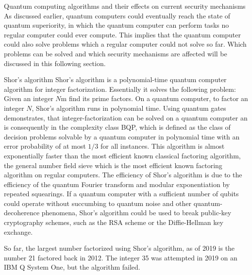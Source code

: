 \documentclass[aps,twocolumn,preprintnumbers]{revtex4}
\begin{document}
\begin{section}{Quantum computing algorithms and their effects on current security mechanisms}
As discussed earlier, quantum computers could eventually reach the state of quantum superiority, 
in which the quantum computer can perform tasks no regular computer could ever compute.
This implies that the quantum computer could also solve problems which a regular computer could not solve so far.
Which problems can be solved and which security mechanisms are affected will be discussed in this following section. 

\begin{subsection}{Shor's algorithm}
Shor's algorithm is a polynomial-time quantum computer algorithm for integer factorization.
Essentially it solves the following problem: 
Given an integer $N$m find its prime factors. 
On a quantum computer, to factor an integer $N$, 
Shor's algorithm runs in polynomial time. 
Using quantum gates demonstrates, 
that integer-factorization can be solved on a quantum computer an is consequently in the complexity class BQP, 
which is defined as the class of decision problems solvable by a quantum computer in polynomial time with an error probability of at most $1/3$ for all instances. 
This algorithm is almost exponentially faster than the most efficient known classical factoring algorithm, the general number field sieve which is the most efficient known factoring algorithm on regular computers. 
The efficiency of Shor's algorithm is due to the efficiency of the quantum Fourier transform and modular exponentiation by repeated squearings. 
If a quantum computer with a sufficient number of qubits could operate without succumbing to quantum noise and other quantum-decoherence phenomena, 
Shor's algorithm could be used to break public-key cryptography schemes, 
such as the RSA scheme or the Diffie-Hellman key exchange. 

So far, the largest number factorized using Shor's algorithm, 
as of 2019 is the number 21 factored back in 2012. 
The integer 35 was attempted in 2019 on an IBM Q System One, 
but the algorithm failed. 

\end{subsection}


\end{section}
\end{document}
